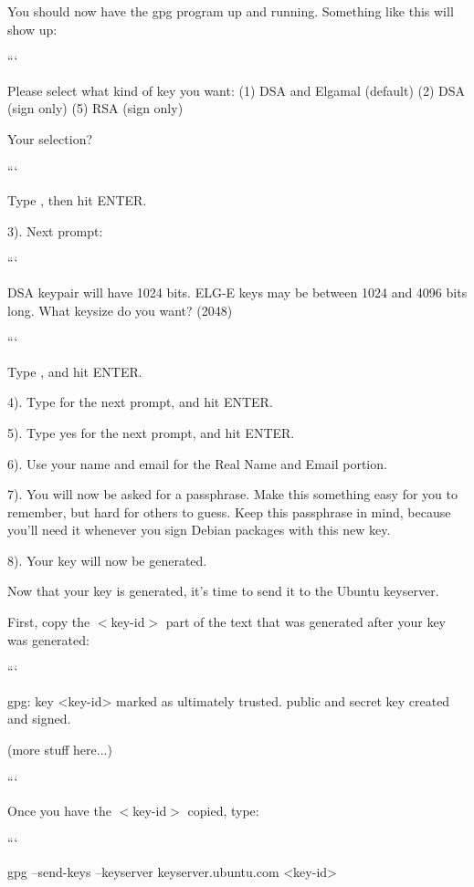 You should now have the {\ttfamily gpg} program up and running. Something like this will show up\-:

``` \begin{DoxyVerb}Please select what kind of key you want:
(1) DSA and Elgamal (default)
(2) DSA (sign only)
(5) RSA (sign only)

Your selection? 
\end{DoxyVerb}


```

Type {}, then hit {\ttfamily E\-N\-T\-E\-R}.

3). Next prompt\-:

``` \begin{DoxyVerb}DSA keypair will have 1024 bits.
ELG-E keys may be between 1024 and 4096 bits long.
What keysize do you want? (2048)
\end{DoxyVerb}


```

Type {}, and hit {\ttfamily E\-N\-T\-E\-R}.

4). Type {} for the next prompt, and hit {\ttfamily E\-N\-T\-E\-R}.

5). Type {\ttfamily yes} for the next prompt, and hit {\ttfamily E\-N\-T\-E\-R}.

6). Use your name and email for the {\ttfamily Real Name} and {\ttfamily Email} portion.

7). You will now be asked for a passphrase. Make this something easy for you to remember, but hard for others to guess. Keep this passphrase in mind, because you'll need it whenever you sign Debian packages with this new key.

8). Your key will now be generated.

Now that your key is generated, it's time to send it to the Ubuntu keyserver.

First, copy the {\ttfamily $<$key-\/id$>$} part of the text that was generated after your key was generated\-:

``` \begin{DoxyVerb}gpg: key <key-id> marked as ultimately trusted.
public and secret key created and signed. 

(more stuff here...)
\end{DoxyVerb}


```

Once you have the {\ttfamily $<$key-\/id$>$} copied, type\-:

``` \begin{DoxyVerb}gpg --send-keys --keyserver keyserver.ubuntu.com <key-id>
\end{DoxyVerb}



